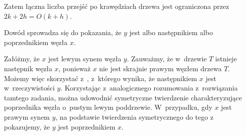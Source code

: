 Zatem łączna liczba przejść po krawędziach drzewa jest ograniczona przez $2k+2h=O(k+h)$.

\exercise %

\noindent Dowód sprowadza się do pokazania, że $y$ jest albo następnikiem albo poprzednikiem węzła $x$.

Załóżmy, że $x$ jest lewym synem węzła $y$.
Zauważmy, że w~drzewie $T$ istnieje następnik węzła $x$, ponieważ $x$ nie jest skrajnie prawym węzłem drzewa $T$.
Możemy więc skorzystać z~, z~którego wynika, że następnikiem $x$ jest w~rzeczywistości $y$.
Korzystając z~analogicznego rozumowania z~rozwiązania tamtego zadania, można udowodnić symetryczne twierdzenie charakteryzujące poprzednika węzła o~pustym lewym poddrzewie.
W~przypadku, gdy $x$ jest prawym synem $y$, na podstawie twierdzenia symetrycznego do tego z~ pokazujemy, że $y$ jest poprzednikiem $x$.
